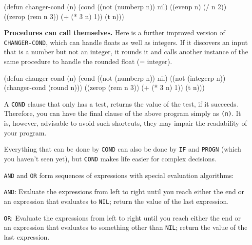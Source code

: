\documentclass[a4paper,11pt]{article}
\begin{document}
\begin{uenum}
\begin{lispcode}
(defun changer-cond (n)
  (cond ((not (numberp n)) nil)
        ((evenp n) (/ n 2))
        ((zerop (rem n 3)) (+ (* 3 n) 1))
        (t n)))
\end{lispcode}

\item {\bf Procedures can call themselves.} Here is a further improved version of \Verb+CHANGER-COND+, which can handle floats as well as integers. If it discovers an input that is a number but not an integer, it rounds it and calls another instance of the same procedure to handle the rounded float (= integer).  

\begin{lispcode}
(defun changer-cond (n)
  (cond ((not (numberp n)) nil)
        ((not (integerp n)) (changer-cond (round n)))
        ((zerop (rem n 3)) (+ (* 3 n) 1))
        (t n)))
\end{lispcode}

\item A \Verb+COND+ clause that only has a test, returns the value of the test, if it succeeds. Therefore, you can have the final clause of the above program simply as \Verb+(n)+. It is, however, advisable to avoid such shortcuts, they may impair the readability of your program. 

\item Everything that can be done by \Verb+COND+ can also be done by \Verb+IF+ and \Verb+PROGN+ (which you haven't seen yet), but \Verb+COND+ makes life easier for complex decisions.  

\item \Verb+AND+ and \Verb+OR+ form sequences of expressions with special evaluation algorithms:
\begin{uenumi}
\item \Verb+AND+: Evaluate the expressions from left to right until you reach either the end or an expression that evaluates to \Verb+NIL+; return the value of the last expression.
\item \Verb+OR+: Evaluate the expressions from left to right until you reach either the end or an expression that evaluates to something other than \Verb+NIL+; return the value of the last expression.



\end{uenumi}
\end{uenum}
\end{document}
